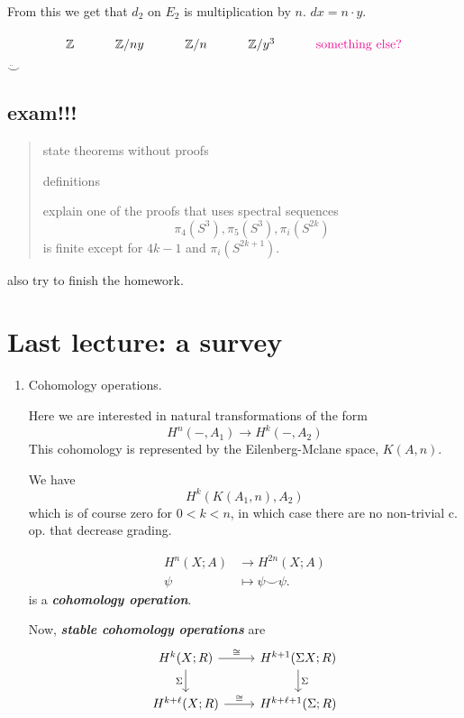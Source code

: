 \documentclass{article}
\newcommand{\Z}{\mathbb{Z}}
\begin{document}
\begin{example}
From this we get that $d_2$ on $E_2$ is multiplication by $n$. $dx=n\cdot y$.

\[\begin{tikzcd}
	\Z&\Z/ny&\Z/n&\Z/y^3&{\color{magenta}\text{something else?} }
\end{tikzcd}\]
$\ddot\smile $


\subsection{exam!!!}\label{ssec:exam!!!}
\begin{quotation}
	state theorems without proofs

	definitions

	explain one of the proofs that uses spectral sequences
	\[\pi_{4}(S^3),\pi_{5}(S^3),\pi_{i}(S^{2k})\]
	is finite except for $4k-1$ and $\pi_{i}(S^{2k+1})$.
\end{quotation}
also try to finish the homework.

\section{Last lecture: a survey}\label{sec:Last lecture: a survey}
\begin{enumerate}
	\item Cohomology operations.

	Here we are interested in natural transformations of the form 
	\[H^{n}(-,A_1)\to H^{k}(-,A_2)\]
	This cohomology is represented by the Eilenberg-Mclane space, $K(A,n)$.

	We have
	\[H^{k}(K(A_1,n),A_2)\]
	which is of course zero for $0<k<n$, in which case there are no non-trivial c. op. that decrease grading.

	\begin{example}
		\begin{align*}
			 H^{n}(X;A) &\longrightarrow H^{2n}(X;A) \\
			\psi &\longmapsto \psi\smile \psi
		.\end{align*}
	is a \textit{\textbf{cohomology operation}}.	
	\end{example}

	Now, \textit{\textbf{stable cohomology operations}} are
	\[\begin{tikzcd}
		H^{k}(X;R)\arrow[r,"\cong "]\arrow[d,"\Sigma",swap]&H^{k+1}(\Sigma X;R)\arrow[d,"\Sigma"]\\
		H^{k+\ell}(X;R)\arrow[r,"\cong "]&H^{k+\ell+1}(\Sigma;R)
	\end{tikzcd}\]
	

\end{enumerate}
\end{example}
\end{document}
